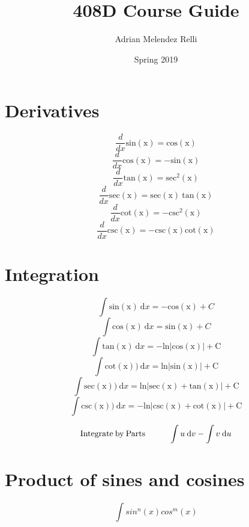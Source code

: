 \documentclass{article}
\title{408D Course Guide}
\author{Adrian Melendez Relli}
\date{Spring 2019}
\begin{document}
\maketitle




\section{Derivatives}
\begin{multicols}{3}

$$ \frac{d}{dx} \mathrm{sin(x) = cos(x)}$$
$$ \frac{d}{dx} \mathrm{cos(x) = -sin(x)}$$
$$ \frac{d}{dx} \mathrm{tan(x) = sec^2(x)}$$
$$ \frac{d}{dx} \mathrm{sec(x) = sec(x)\:tan(x)}$$
$$ \frac{d}{dx} \mathrm{cot(x) = -csc^2(x)}$$
$$ \frac{d}{dx} \mathrm{csc(x) = -csc(x)cot(x)}$$


\end{multicols}




\section{Integration}
\begin{multicols}{3}

$$ \int \mathrm{sin(x)} \:\mathrm{d}x = \mathrm{-cos(x)} + C $$ 
$$ \int \mathrm{cos(x)} \:\mathrm{d}x = \mathrm{sin(x)} + C $$
$$ \int \mathrm{tan(x)} \:\mathrm{d}x = \mathrm{-ln|cos(x)| + C} $$
$$ \int \mathrm{cot(x))} \:\mathrm{d}x = \mathrm{ln|sin(x)| + C} $$
$$ \int \mathrm{sec(x))} \:\mathrm{d}x = \mathrm{ln|sec(x) + tan(x)| + C} $$
$$ \int \mathrm{csc(x))} \:\mathrm{d}x = \mathrm{-ln|csc(x) + cot(x)| + C} $$

\end{multicols}

$$\mathrm{Integrate\:by\:Parts } \hspace{10mm}\int u \:\mathrm{d}v - \int v \:\mathrm{d}u$$






\section{Product of sines and cosines}

$$ \int sin^n(x) cos^m(x) $$
\end{document}
